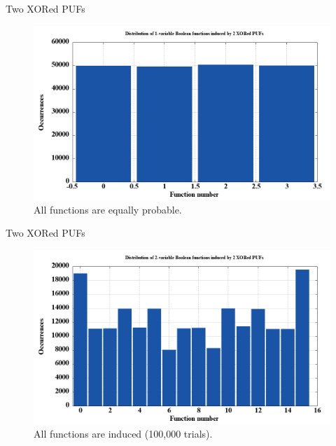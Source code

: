 \documentclass[10pt, compress]{beamer}
\begin{document}
\begin{frame}{Two XORed PUFs}
    \begin{figure}
        \centering
        \includegraphics[width=\textwidth]{figures/dist/distribution_of_1-variable_boolean_functions_induced_by_2_xored_pufs.png}
        \caption{All functions are equally probable.}
    \end{figure}
\end{frame}

\begin{frame}{Two XORed PUFs}
    \begin{figure}
        \centering
        \includegraphics[width=\textwidth]{figures/dist/distribution_of_2-variable_boolean_functions_induced_by_2_xored_pufs.png}
        \caption{All functions are induced (100,000 trials).}
    \end{figure}
\end{frame}
\end{document}
